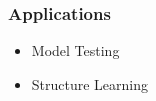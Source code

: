 \documentclass{beamer}
\def\ci{\perp\!\!\!\!\!\perp}
\begin{document}
\begin{frame}
	\frametitle{Applications}
	\begin{itemize}
		\item Model Testing 
		\item Structure Learning
	\end{itemize}	
\end{frame}

% 
% 
% 
\end{document}
